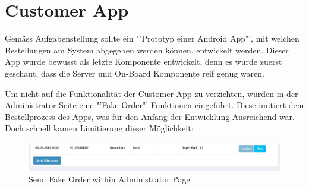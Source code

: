 \section{Customer App}
Gemäss Aufgabenstellung sollte ein "'Prototyp einer Android App"', mit welchen Bestellungen am System abgegeben werden können, entwickelt werden.
Dieser App wurde bewusst als letzte Komponente entwickelt, denn es wurde zuerst geschaut, dass die Server und On-Board Komponente reif genug waren.

Um nicht auf die Funktionalität der Customer-App zu verzichten, wurden in der Administrator-Seite eine "'Fake Order"' Funktionen eingeführt.
Diese imitiert dem Bestellprozess des Apps, was für den Anfang der Entwicklung Ausreichend war. Doch schnell kamen Limitierung dieser Möglichkeit:

\begin{figure}[h]
	\centering
	\includegraphics[width=1\textwidth] {images/customer-app-fake-order.png}
	\caption{Send Fake Order within Administrator Page}
	\label{fig:pixhawk}
\end{figure}




